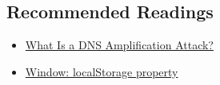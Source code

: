 \subsection{Recommended Readings}
\begin{itemize}[noitemsep]
	\item \href{https://www.f5.com/labs/learning-center/what-is-a-dns-amplification-attack}{What Is a DNS Amplification Attack?}
	\item \href{https://developer.mozilla.org/en-US/docs/Web/API/Window/localStorage}{Window: localStorage property}
\end{itemize}
